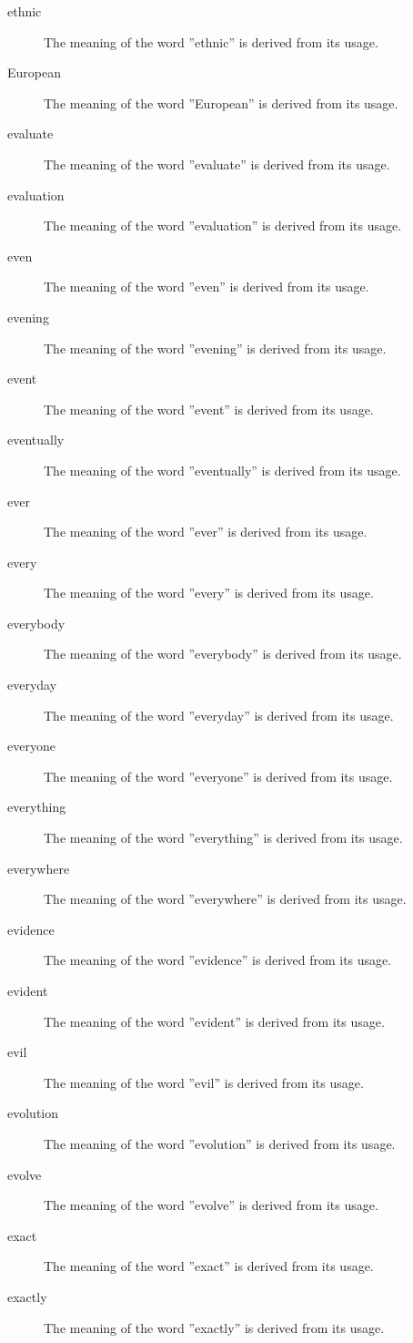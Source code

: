 \documentclass[12pt, letterpaper]{memoir}
\begin{document}
\begin{description}
\item[ethnic] The meaning of the word ''ethnic'' is derived from its usage.
\item[European] The meaning of the word ''European'' is derived from its usage.
\item[evaluate] The meaning of the word ''evaluate'' is derived from its usage.
\item[evaluation] The meaning of the word ''evaluation'' is derived from its usage.
\item[even] The meaning of the word ''even'' is derived from its usage.
\item[evening] The meaning of the word ''evening'' is derived from its usage.
\item[event] The meaning of the word ''event'' is derived from its usage.
\item[eventually] The meaning of the word ''eventually'' is derived from its usage.
\item[ever] The meaning of the word ''ever'' is derived from its usage.
\item[every] The meaning of the word ''every'' is derived from its usage.
\item[everybody] The meaning of the word ''everybody'' is derived from its usage.
\item[everyday] The meaning of the word ''everyday'' is derived from its usage.
\item[everyone] The meaning of the word ''everyone'' is derived from its usage.
\item[everything] The meaning of the word ''everything'' is derived from its usage.
\item[everywhere] The meaning of the word ''everywhere'' is derived from its usage.
\item[evidence] The meaning of the word ''evidence'' is derived from its usage.
\item[evident] The meaning of the word ''evident'' is derived from its usage.
\item[evil] The meaning of the word ''evil'' is derived from its usage.
\item[evolution] The meaning of the word ''evolution'' is derived from its usage.
\item[evolve] The meaning of the word ''evolve'' is derived from its usage.
\item[exact] The meaning of the word ''exact'' is derived from its usage.
\item[exactly] The meaning of the word ''exactly'' is derived from its usage.

\end{description}
\end{document}
